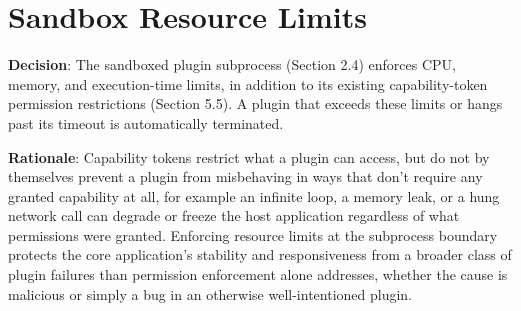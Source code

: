 \section{Sandbox Resource Limits}
\textbf{Decision}: The sandboxed plugin subprocess (Section 2.4) enforces CPU, memory, and execution-time limits, in addition to its existing capability-token permission restrictions (Section 5.5). A plugin that exceeds these limits or hangs past its timeout is automatically terminated.

\textbf{Rationale}: Capability tokens restrict what a plugin can access, but do not by themselves prevent a plugin from misbehaving in ways that don't require any granted capability at all, for example an infinite loop, a memory leak, or a hung network call can degrade or freeze the host application regardless of what permissions were granted. Enforcing resource limits at the subprocess boundary protects the core application's stability and responsiveness from a broader class of plugin failures than permission enforcement alone addresses, whether the cause is malicious or simply a bug in an otherwise well-intentioned plugin.


\sentinelchapterend